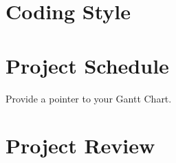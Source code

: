 \documentclass{article}
\begin{document}
\section{Coding Style}


\section{Project Schedule}

Provide a pointer to your Gantt Chart.

\section{Project Review}
\end{document}
